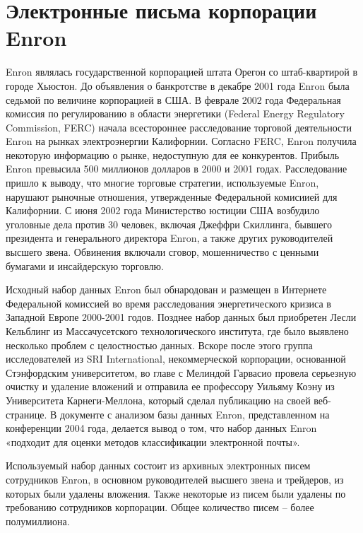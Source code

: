\section{Электронные письма корпорации Enron}

Enron являлась государственной корпорацией штата Орегон со штаб-квартирой в городе Хьюстон. До объявления о банкротстве в декабре 2001 года Enron была седьмой по величине корпорацией в США. В феврале 2002 года Федеральная комиссия по регулированию в области энергетики (Federal Energy Regulatory Commission, FERC) начала всестороннее расследование торговой деятельности Enron на рынках электроэнергии Калифорнии. Согласно FERC, Enron получила некоторую информацию о рынке, недоступную для ее конкурентов. Прибыль Enron превысила 500 миллионов долларов в 2000 и 2001 годах. Расследование пришло к выводу, что многие торговые стратегии, используемые Enron, нарушают рыночные отношения, утвержденные Федеральной комисиией для Калифорнии. С июня 2002 года Министерство юстиции США возбудило уголовные дела против 30 человек, включая Джеффри Скиллинга, бывшего президента и генерального директора Enron, а также других руководителей высшего звена. Обвинения включали сговор, мошенничество с ценными бумагами и инсайдерскую торговлю.

Исходный набор данных Enron был обнародован и размещен в Интернете Федеральной комиссией во время расследования энергетического кризиса в Западной Европе 2000-2001 годов. Позднее набор данных был приобретен Лесли Кельблинг из Массачусетского технологического института, где было выявлено несколько проблем с целостностью данных. Вскоре после этого группа исследователей из SRI International, некоммерческой корпорации, основанной Стэнфордским университетом, во главе с Мелиндой Гарвасио провела серьезную очистку и удаление вложений и отправила ее профессору Уильяму Коэну из Университета Карнеги-Меллона, который сделал публикацию на своей веб-странице. В документе с анализом базы данных Enron, представленном на конференции 2004 года, делается вывод о том, что набор данных Enron «подходит для оценки методов классификации электронной почты».

Используемый набор данных состоит из архивных электронных писем сотрудников Enron, в основном  руководителей высшего звена и трейдеров, из которых были удалены вложения. Также некоторые из писем были удалены по требованию сотрудников корпорации. Общее количество писем -- более полумиллиона.